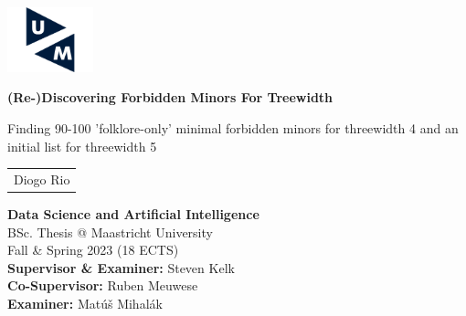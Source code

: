 \begin{titlepage}

\hspace*{-0.5cm}\includegraphics[width=2.5cm]{um-logo.png} \\

\vspace{2cm}

\begin{center}
    
    \vspace{2cm}

    {\huge
    \begin{spacing}{1.0}
        \textbf{(Re-)Discovering Forbidden Minors For Treewidth}
    \end{spacing}
    }
        

    \vspace{0.5cm}                                                                              
    {\LARGE
    \begin{spacing}{1.0}
     Finding 90-100 'folklore-only' minimal forbidden minors for threewidth 4 and an initial list for threewidth 5
    \end{spacing}
    }

    \vspace{2cm}
        
    {\LARGE \renewcommand{\arraystretch}{1.2}
        \begin{tabular}{c}
            Diogo Rio \\
        \end{tabular}
    }
    
\end{center} 


\vfill
\begin{flushleft}
    { \large
    \textbf{Data Science and Artificial Intelligence} \\  
    BSc. Thesis @ Maastricht University \\  
    Fall \& Spring 2023 (18 ECTS) \\ 
    \textbf{Supervisor \& Examiner:} Steven Kelk \\
    \textbf{Co-Supervisor:} Ruben Meuwese \\
    \textbf{Examiner:} Matúš Mihalák \\
    }
\end{flushleft}

\restoregeometry
\end{titlepage}
